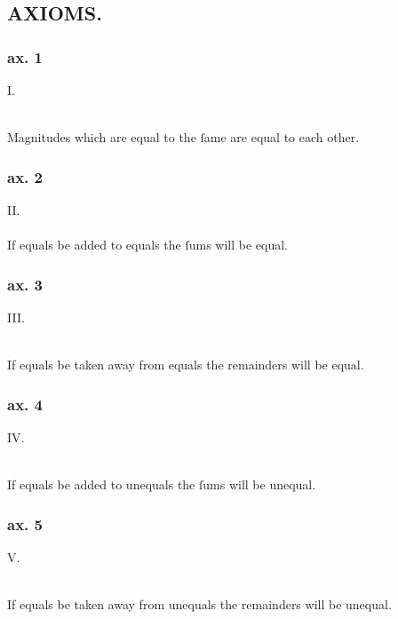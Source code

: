 \begin{minipage}{0.165\textwidth}
    \phantom{}
\end{minipage}%
\begin{minipage}{0.67\textwidth}
    \subsection[Axioms]{\centering \scshape{\LARGE{AXIOMS.}}}
    \label{subsec:axioms}

    \hfill

    \subsubsection{ax. 1}
    \begin{center}
        I.\label{ax1}\\
        \hfill\\
        \raggedright Magnitudes which are equal to the ſame are equal to each other.\\
    \end{center}
    \subsubsection{ax. 2}
    \begin{center}
        II.\label{ax2}\\
        \hfill\\
        If equals be added to equals the ſums will be equal.\\
    \end{center}
    \subsubsection{ax. 3}
    \begin{center}
        III.\label{ax3}\\
        \hfill\\
        \raggedright If equals be taken away from equals the remainders will be equal.\\
    \end{center}
    \subsubsection{ax. 4}
    \begin{center}
        IV.\label{ax4}\\
        \hfill\\
        \raggedright If equals be added to unequals the ſums will be unequal.\\
    \end{center}
    \subsubsection{ax. 5}
    \begin{center}
        V.\label{ax5}\\
        \hfill\\
        \raggedright If equals be taken away from unequals the remainders will be unequal.
    \end{center}
\end{minipage}
